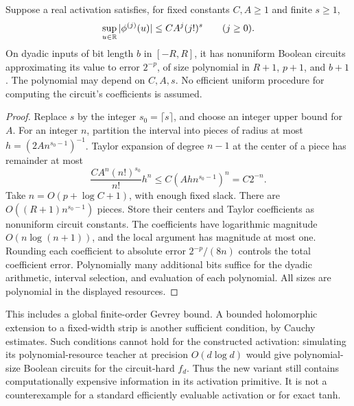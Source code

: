 \begin{proposition}\label{prop:gevrey-evaluation}
Suppose a real activation satisfies, for fixed constants $C,A\ge1$
and finite $s\ge1$,
\[
 \sup_{u\in\mathbb R}|\phi^{(j)}(u)|\le CA^j(j!)^s
 \qquad(j\ge0).
\]
On dyadic inputs of bit length $b$ in $[-R,R]$, it has nonuniform
Boolean circuits approximating its value to error $2^{-p}$, of
size polynomial in $R+1$, $p+1$, and $b+1$. The polynomial may
depend on $C,A,s$. No efficient uniform procedure for computing
the circuit's coefficients is assumed.
\end{proposition}
\begin{proof}
Replace $s$ by the integer $s_0=\lceil s\rceil$, and choose an
integer upper bound for $A$. For an integer $n$, partition the
interval into pieces of radius at most
$h=(2An^{s_0-1})^{-1}$. Taylor expansion of degree $n-1$ at the
center of a piece has remainder at most
\[
 \frac{CA^n(n!)^{s_0}}{n!}h^n
 \le C(Ahn^{s_0-1})^n=C2^{-n}.
\]
Take $n=O(p+\log C+1)$, with enough fixed slack. There are
$O((R+1)n^{s_0-1})$ pieces. Store their centers and Taylor
coefficients as nonuniform circuit constants. The coefficients
have logarithmic magnitude $O(n\log(n+1))$, and the local
argument has magnitude at most one. Rounding each coefficient
to absolute error $2^{-p}/(8n)$ controls the total coefficient
error. Polynomially many additional bits suffice for the dyadic
arithmetic, interval selection, and evaluation of each polynomial.
All sizes are polynomial in the displayed resources.
\end{proof}

This includes a global finite-order Gevrey bound. A bounded
holomorphic extension to a fixed-width strip is another sufficient
condition, by Cauchy estimates. Such conditions cannot hold for
the constructed activation: simulating its polynomial-resource
teacher at precision $O(d\log d)$ would give polynomial-size
Boolean circuits for the circuit-hard $f_d$. Thus the new variant
still contains computationally expensive information in its
activation primitive. It is not a counterexample for a standard
efficiently evaluable activation or for exact tanh.
